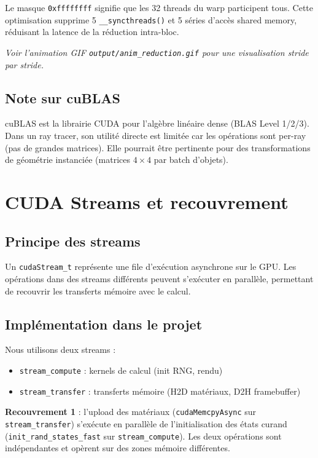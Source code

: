 \documentclass[12pt,a4paper]{article}
\begin{document}
Le masque \texttt{0xffffffff} signifie que les 32 threads du warp participent tous.
Cette optimisation supprime 5 \texttt{\_\_syncthreads()} et 5 séries d'accès shared memory,
réduisant la latence de la réduction intra-bloc.

\textit{Voir l'animation GIF \texttt{output/anim\_reduction.gif} pour une visualisation stride par stride.}

\subsection{Note sur cuBLAS}

cuBLAS est la librairie CUDA pour l'algèbre linéaire dense (BLAS Level 1/2/3).
Dans un ray tracer, son utilité directe est limitée car les opérations sont
per-ray (pas de grandes matrices). Elle pourrait être pertinente pour des
transformations de géométrie instanciée (matrices $4\times4$ par batch d'objets).

\section{CUDA Streams et recouvrement}

\subsection{Principe des streams}

Un \texttt{cudaStream\_t} représente une file d'exécution asynchrone sur le GPU.
Les opérations dans des streams différents peuvent s'exécuter en parallèle,
permettant de recouvrir les transferts mémoire avec le calcul.

\subsection{Implémentation dans le projet}

Nous utilisons deux streams :

\begin{itemize}
    \item \texttt{stream\_compute} : kernels de calcul (init RNG, rendu)
    \item \texttt{stream\_transfer} : transferts mémoire (H2D matériaux, D2H framebuffer)
\end{itemize}

\textbf{Recouvrement 1} : l'upload des matériaux (\texttt{cudaMemcpyAsync} sur
\texttt{stream\_transfer}) s'exécute en parallèle de l'initialisation des états
curand (\texttt{init\_rand\_states\_fast} sur \texttt{stream\_compute}).
Les deux opérations sont indépendantes et opèrent sur des zones mémoire différentes.
\end{document}
